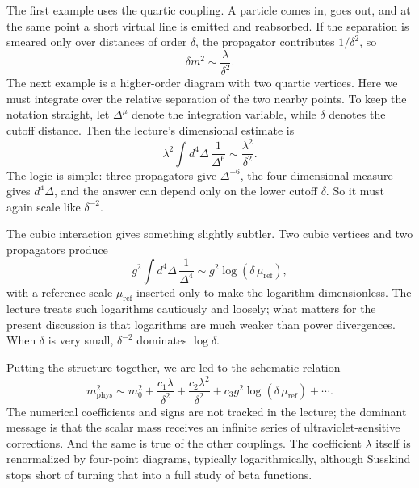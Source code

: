 The first example uses the quartic coupling. A particle comes in, goes out, and at the same point a short virtual line is emitted and reabsorbed. If the separation is smeared only over distances of order \(\delta\), the propagator contributes \(1/\delta^2\), so
\begin{equation}
\delta m^2\sim \frac{\lambda}{\delta^2}.
\end{equation}
The next example is a higher-order diagram with two quartic vertices. Here we must integrate over the relative separation of the two nearby points. To keep the notation straight, let \(\Delta^\mu\) denote the integration variable, while \(\delta\) denotes the cutoff distance. Then the lecture's dimensional estimate is
\begin{equation}
\lambda^2\int d^4\Delta\,\frac{1}{\Delta^6}\sim \frac{\lambda^2}{\delta^2}.
\end{equation}
The logic is simple: three propagators give \(\Delta^{-6}\), the four-dimensional measure gives \(d^4\Delta\), and the answer can depend only on the lower cutoff \(\delta\). So it must again scale like \(\delta^{-2}\).

The cubic interaction gives something slightly subtler. Two cubic vertices and two propagators produce
\begin{equation}
g^2\int d^4\Delta\,\frac{1}{\Delta^4}\sim g^2\log(\delta\,\mu_{\mathrm{ref}}),
\end{equation}
with a reference scale \(\mu_{\mathrm{ref}}\) inserted only to make the logarithm dimensionless. The lecture treats such logarithms cautiously and loosely; what matters for the present discussion is that logarithms are much weaker than power divergences. When \(\delta\) is very small, \(\delta^{-2}\) dominates \(\log\delta\).

Putting the structure together, we are led to the schematic relation
\begin{equation}
m_{\mathrm{phys}}^2\sim
m_0^2
+\frac{c_1\lambda}{\delta^2}
+\frac{c_2\lambda^2}{\delta^2}
+c_3 g^2\log(\delta\,\mu_{\mathrm{ref}})
+\cdots.
\end{equation}
The numerical coefficients and signs are not tracked in the lecture; the dominant message is that the scalar mass receives an infinite series of ultraviolet-sensitive corrections. And the same is true of the other couplings. The coefficient \(\lambda\) itself is renormalized by four-point diagrams, typically logarithmically, although Susskind stops short of turning that into a full study of beta functions.

